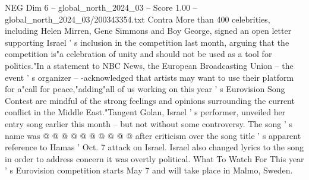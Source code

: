 \begin{textsample}{NEG Dim 6 – global\_north\_2024\_03 – Score 1.00 – global\_north\_2024\_03/200343354.txt}
Contra More than 400 celebrities, including Helen Mirren, Gene Simmons and Boy George, signed an open letter supporting Israel ' s inclusion in the competition last month, arguing that the competition is"a celebration of unity and should not be used as a tool for politics."In a statement to NBC News, the European Broadcasting Union -- the event ' s organizer -- -acknowledged that artists may want to use their platform for a"call for peace,"adding"all of us working on this year ' s Eurovision Song Contest are mindful of the strong feelings and opinions surrounding the current conflict in the Middle East."Tangent Golan, Israel ' s performer, unveiled her entry song earlier this month -- but not without some controversy.
The song ' s name was @ @ @ @ @ @ @ @ @ @ after criticism over the song title ' s apparent reference to Hamas ' Oct. 7 attack on Israel.
Israel also changed lyrics to the song in order to address concern it was overtly political.
What To Watch For This year ' s Eurovision competition starts May 7 and will take place in Malmo, Sweden.

\end{textsample}
